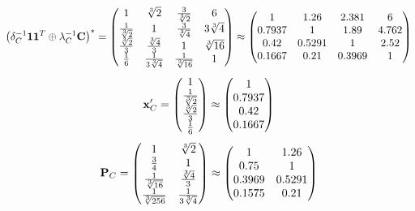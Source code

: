 \documentclass[10pt,a4paper]{article}
\begin{document}
	\[
		\left(\delta_{C}^{-1}\bold{11}^T \oplus \lambda_{C}^{-1}\bold{C}\right)^* = 
		\begin{pmatrix}
			{1} {} & {\sqrt[3]{2}} {} & \frac{{3}} {\sqrt[3]{2}} & {{6}} {} \\
			\frac{1} {\sqrt[3]{2}} & {1} {} & \frac{{3}} {\sqrt[3]{4}} & {{3}\sqrt[3]{4}} {} \\
			\frac{\sqrt[3]{2}} {{3}} & \frac{\sqrt[3]{4}} {{3}} & {1} {} & {\sqrt[3]{16}} {} \\
			\frac{1} {{6}} & \frac{1} {{3}\sqrt[3]{4}} & \frac{1} {\sqrt[3]{16}} & {1} {} \\
		\end{pmatrix}
		\approx
		\begin{pmatrix}
			1        & 1.26     & 2.381    & 6        \\
			0.7937   & 1        & 1.89     & 4.762    \\
			0.42     & 0.5291   & 1        & 2.52     \\
			0.1667   & 0.21     & 0.3969   & 1        \\
		\end{pmatrix}
	\]
	\[
		\bold{x}'_{C} = 
		\begin{pmatrix}
			{1} {} \\
			\frac{1} {\sqrt[3]{2}} \\
			\frac{\sqrt[3]{2}} {{3}} \\
			\frac{1} {{6}} \\
		\end{pmatrix}
		\approx
		\begin{pmatrix}
			1        \\
			0.7937   \\
			0.42     \\
			0.1667   \\
		\end{pmatrix}
	\]
	\[
		\bold{P}_{C} = 
		\begin{pmatrix}
			{1} {} & {\sqrt[3]{2}} {} \\
			\frac{{3}} {{4}} & {1} {} \\
			\frac{1} {\sqrt[3]{16}} & \frac{\sqrt[3]{4}} {{3}} \\
			\frac{1} {\sqrt[3]{256}} & \frac{1} {{3}\sqrt[3]{4}} \\
		\end{pmatrix}
		\approx
		\begin{pmatrix}
			1        & 1.26     \\
			0.75     & 1        \\
			0.3969   & 0.5291   \\
			0.1575   & 0.21     \\
		\end{pmatrix}
	\]
\end{document}
